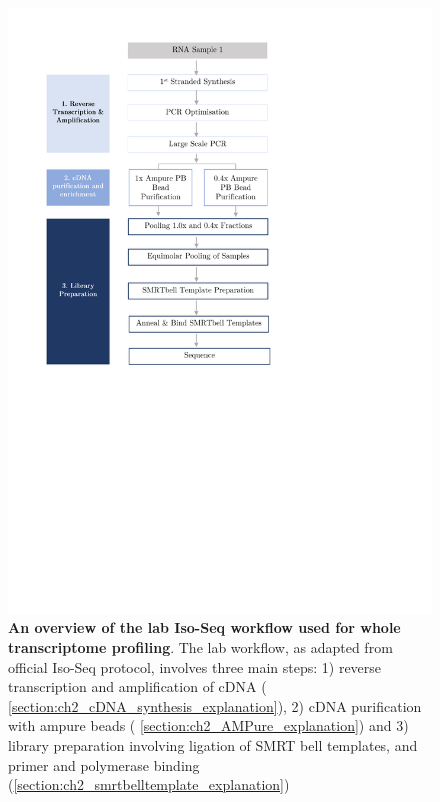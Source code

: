 \begin{figure}[htp]
	\includegraphics[page=1,trim={0 12cm 5cm 1cm},clip,scale = 1]{Figures/ProjectDevelopment_Figures.pdf}
	\captionsetup{width=0.95\textwidth}
	\caption[Iso-Seq Lab workflow used for whole transcriptome sequencing]%
	{\textbf{An overview of the lab Iso-Seq workflow used for whole transcriptome profiling}. The lab workflow, as adapted from official Iso-Seq protocol, involves three main steps: 1) reverse transcription and amplification of cDNA ( \cref{section:ch2_cDNA_synthesis_explanation}), 2) cDNA purification with ampure beads ( \cref{section:ch2_AMPure_explanation}) and 3) library preparation involving ligation of SMRT bell templates, and primer and polymerase binding (\cref{section:ch2_smrtbelltemplate_explanation})}
	\label{fig:isoseq_wholelab_protocol}
\end{figure}

